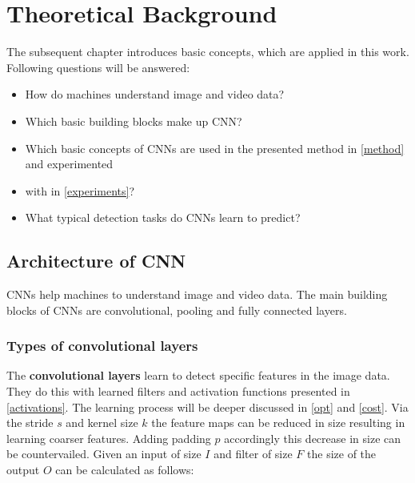 


\chapter{Theoretical Background} %

\label{theory} %
The subsequent chapter introduces basic concepts, which are applied in this work.
Following questions will be answered:
\begin{itemize}
    \item How do machines understand image and video data?
    \item Which basic building blocks make up \gls{CNN}?
    \item Which basic concepts of \glspl{CNN} are used in the presented method in \autoref{method} and experimented
    \item with in \autoref{experiments}?
    \item What typical detection tasks do \glspl{CNN} learn to predict?

\end{itemize}

\section{Architecture of \gls{CNN}}
\glspl{CNN} help machines to understand image and video data.
The main building blocks of \glspl{CNN} are convolutional, pooling and fully connected layers.
\subsection{Types of convolutional layers}
The \textbf{convolutional layers} learn to detect specific features in the image data.
They do this with learned filters and activation functions presented in \autoref{activations}.
The learning process will be deeper discussed in \autoref{opt} and \autoref{cost}.
Via the stride $s$ and kernel size $k$ the feature maps can be reduced in size resulting in
learning coarser features.
Adding padding $p$ accordingly this decrease in size can be countervailed.
Given an input of size $I$ and filter of size $F$ the size of the output $O$ can be calculated as follows:

